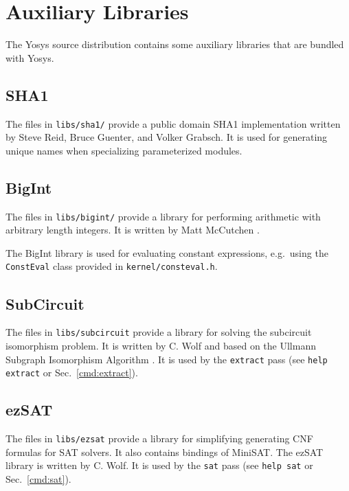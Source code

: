 
\chapter{Auxiliary Libraries}

The Yosys source distribution contains some auxiliary libraries that are bundled
with Yosys.

\section{SHA1}

The files in {\tt libs/sha1/} provide a public domain SHA1 implementation written
by Steve Reid, Bruce Guenter, and Volker Grabsch. It is used for generating
unique names when specializing parameterized modules.

\section{BigInt}

The files in {\tt libs/bigint/} provide a library for performing arithmetic with
arbitrary length integers. It is written by Matt McCutchen .

The BigInt library is used for evaluating constant expressions, e.g.~using the {\tt
ConstEval} class provided in {\tt kernel/consteval.h}.

\section{SubCircuit}
\label{sec:SubCircuit}

The files in {\tt libs/subcircuit} provide a library for solving the subcircuit
isomorphism problem. It is written by C. Wolf and based on the Ullmann
Subgraph Isomorphism Algorithm \cite{UllmannSubgraphIsomorphism}. It is used by
the {\tt extract} pass (see {\tt help extract} or Sec.~\ref{cmd:extract}).

\section{ezSAT}

The files in {\tt libs/ezsat} provide a library for simplifying generating CNF
formulas for SAT solvers. It also contains bindings of MiniSAT. The ezSAT
library is written by C. Wolf. It is used by the {\tt sat} pass (see
{\tt help sat} or Sec.~\ref{cmd:sat}).

